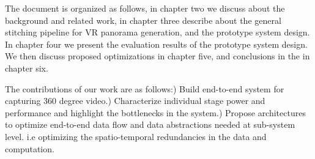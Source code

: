 

The document is organized as follows, in chapter two we discuss about the background and related work, in chapter three describe about the general stitching pipeline for VR panorama generation, and the prototype system design. In chapter four we present the evaluation results of the prototype system design. We then discuss proposed optimizations in chapter five, and conclusions in the  in chapter six.

The contributions of our work are as follows:) Build end-to-end system for capturing 360 degree video.) Characterize individual stage power and performance and highlight the bottlenecks in the system.) Propose architectures to optimize end-to-end data flow and data abstractions needed at sub-system level. i.e optimizing the spatio-temporal redundancies in the data and computation.\newline







